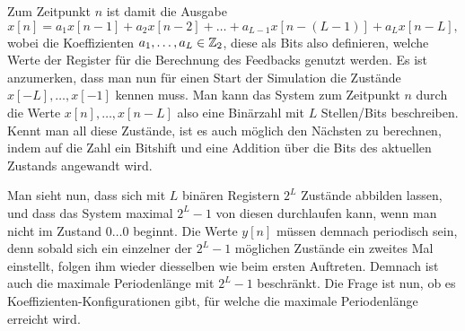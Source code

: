 Zum Zeitpunkt $n$ ist damit die Ausgabe
\[
x[n] 
    =   a_1 x[n-1] 
      + a_2 x[n-2] 
      + \ldots 
      + a_{L-1} x[n - (L-1)] 
      + a_L x[n-L],
\]
wobei die Koeffizienten $a_1, \ldots, a_{L} \in \mathbb{Z}_2$, diese als Bits also definieren, welche Werte der Register für die Berechnung des Feedbacks genutzt werden.
Es ist anzumerken, dass man nun für einen Start der Simulation die Zustände $x[-L], \ldots, x[-1]$ kennen muss.
Man kann das System zum Zeitpunkt $n$ durch die Werte $x[n], \ldots, x[n-L]$ also eine Binärzahl mit $L$ Stellen/Bits beschreiben. 
Kennt man all diese Zustände, ist es auch möglich den Nächsten zu berechnen, indem auf die Zahl ein Bitshift und eine  Addition über die Bits des aktuellen Zustands angewandt wird.

Man sieht nun, dass sich mit $L$ binären Registern $2^L$ Zustände abbilden lassen, und dass das System maximal $2^L-1$ von diesen durchlaufen kann, wenn man nicht im Zustand $0\ldots 0$ beginnt.
Die Werte $y[n]$ müssen demnach periodisch sein, denn sobald sich ein einzelner der $2^L-1$ möglichen Zustände ein zweites Mal einstellt, folgen ihm wieder diesselben wie beim ersten Auftreten.
Demnach ist auch die maximale Periodenlänge mit $2^L-1$ beschränkt.
Die Frage ist nun, ob es Koeffizienten-Konfigurationen gibt, für welche die maximale Periodenlänge erreicht wird.

